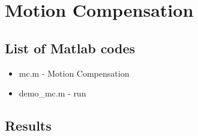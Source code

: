 \documentclass[article,oneside]{memoir}
\begin{document}
\newpage

\section{Motion Compensation}

\subsection{List of Matlab codes}

\begin{itemize}
\item mc.m - Motion Compensation
\item demo\_mc.m - run
\end{itemize}
\subsection{Results}
\end{document}

